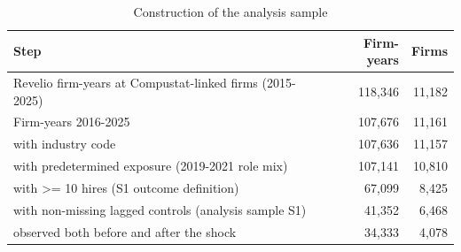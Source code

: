 \begin{table}[!htbp]\centering\footnotesize
\caption{Construction of the analysis sample}\label{tab:flow}
\begin{tabular}{lrr}
\toprule
Step & Firm-years & Firms \\
\midrule
Revelio firm-years at Compustat-linked firms (2015-2025) & 118,346 & 11,182 \\
Firm-years 2016-2025 & 107,676 & 11,161 \\
with industry code & 107,636 & 11,157 \\
with predetermined exposure (2019-2021 role mix) & 107,141 & 10,810 \\
with >= 10 hires (S1 outcome definition) & 67,099 & 8,425 \\
with non-missing lagged controls (analysis sample S1) & 41,352 & 6,468 \\
observed both before and after the shock & 34,333 & 4,078 \\
\bottomrule
\end{tabular}
\end{table}